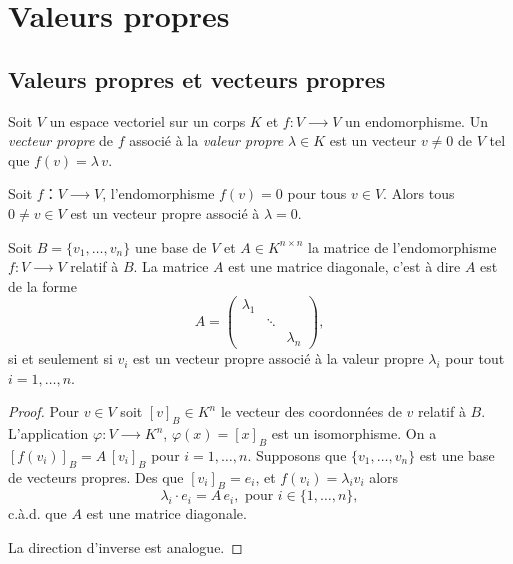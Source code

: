 \chapter{Valeurs propres}
\label{cha:valeurs-propres-et}


\section{Valeurs propres et vecteurs propres}
\label{sec:valeurs-propres-et}

\begin{definition}
  \label{def:16}
  Soit $V$ un espace vectoriel sur un corps $K$ et $f \colon V ⟶V$ un endomorphisme. Un \emph{vecteur propre} de $f$  associé à la \emph{valeur propre} $λ ∈K$ est un vecteur $v ≠ 0$ de $V$ tel que $f(v) = λ\,v$.
\end{definition}

\begin{example}
  \label{exe:23}
  Soit $f：V⟶V$, l'endomorphisme $f(v) = 0$ pour tous $v ∈V$. Alors tous $0≠v ∈V$ est un vecteur propre associé à $λ=0$. 
\end{example}


\begin{lemma}
  \label{lem:4}
  Soit $B = \{v_1,\dots,v_n\}$ une base de $V$ et $A ∈ K^{n×n}$ la matrice de l'endomorphisme $f : V ⟶V$ relatif à $B$. La matrice $A$ est une matrice diagonale, c'est à dire $A$ est de la forme
  \begin{displaymath}
    A =
    \begin{pmatrix}
      λ_1  \\
         & \ddots \\
         & & λ_n
    \end{pmatrix},
  \end{displaymath}
si et seulement si $v_i$ est un vecteur propre associé à la valeur propre $λ_i$ pour tout $i=1,\dots,n$.
\end{lemma}

\begin{proof}
  Pour $v ∈V$ soit $[v]_B ∈K^n$ le vecteur des coordonnées de $v$ relatif à $B$. L'application $φ: V ⟶ K^n$, $φ(x) = [x]_B$ est un isomorphisme.  On a $[f(v_i)]_B = A \,  [v_i]_B$ pour $i=1,\dots,n$.
Supposons que $\{v_1,\dots,v_n\}$ est une base de vecteurs propres. 
  Des que $[v_i]_B = e_i$, et $f(v_i) = λ_i v_i$ alors
    \begin{displaymath}
      λ_i ⋅ e_i = A \, e_i, \text{ pour } i ∈\{1,\dots,n\},
    \end{displaymath}
    c.à.d. que $A$ est une matrice diagonale.

La direction d'inverse est analogue. 
\end{proof}


